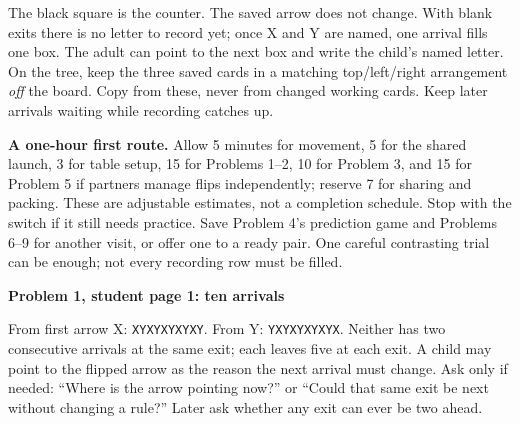 \documentclass[11pt]{article}
\newcommand{\sub}[1]{\par\textbf{#1}\par}
\newcommand{\code}[1]{\texttt{#1}}
\begin{document}
\begin{center}
\end{center}
The black square is the counter. The saved arrow does not change. With blank exits there is no letter to record yet; once X and Y are named, one arrival fills one box. The adult can point to the next box and write the child's named letter. On the tree, keep the three saved cards in a matching top/left/right arrangement \emph{off} the board. Copy from these, never from changed working cards. Keep later arrivals waiting while recording catches up.

\textbf{A one-hour first route.} Allow 5 minutes for movement, 5 for the shared launch, 3 for table setup, 15 for Problems 1--2, 10 for Problem 3, and 15 for Problem 5 if partners manage flips independently; reserve 7 for sharing and packing. These are adjustable estimates, not a completion schedule. Stop with the switch if it still needs practice. Save Problem 4's prediction game and Problems 6--9 for another visit, or offer one to a ready pair. One careful contrasting trial can be enough; not every recording row must be filled.

\sub{Problem 1, student page 1: ten arrivals}
From first arrow X: \code{XYXYXYXYXY}. From Y: \code{YXYXYXYXYX}. Neither has two consecutive arrivals at the same exit; each leaves five at each exit. A child may point to the flipped arrow as the reason the next arrival must change. Ask only if needed: ``Where is the arrow pointing now?'' or ``Could that same exit be next without changing a rule?'' Later ask whether any exit can ever be two ahead.
\end{document}
